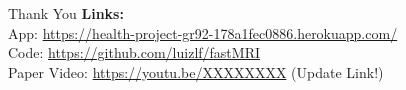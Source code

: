 \documentclass{beamer}
\begin{document}
\begin{frame}
  \begin{center}
    \Huge Thank You
    \vfill
    \large \textbf{Links:} \\
    App: \url{https://health-project-gr92-178a1fec0886.herokuapp.com/} \\
    Code: \url{https://github.com/luizlf/fastMRI} \\
    Paper Video: \url{https://youtu.be/XXXXXXXX} (Update Link!)
  \end{center}
\end{frame}
\end{document}
